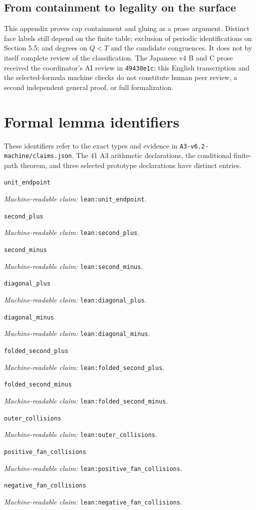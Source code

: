 \documentclass[11pt]{amsart}
\newcommand{\record}[1]{\nolinkurl{#1}}
\newcommand{\claimid}[1]{\par\nopagebreak\noindent\textit{Machine-readable claim:} \record{#1}.\par}
\begin{document}
\subsection{From containment to legality on the surface}
This appendix proves cap containment and gluing as a prose argument.
Distinct face labels still depend on the finite table; exclusion of
periodic identifications on Section 5.5; and degrees on $Q<T$ and the
candidate congruences. It does not by itself complete review of the
classification. The Japanese v4 B and C prose received the coordinator's
AI review in \record{49430e1c}; this English transcription and the
selected-formula machine checks do not constitute human peer review,
a second independent general proof, or full formalization.

\section*{Formal lemma identifiers}
These identifiers refer to the exact types and evidence in \record{A3-v6.2-machine/claims.json}.
The 41 A3 arithmetic declarations, the conditional finite-path theorem,
and three selected prototype declarations have distinct entries.
\par\noindent\label{lean:unit_endpoint}\record{unit_endpoint}
\claimid{lean:unit_endpoint}
\par\noindent\label{lean:second_plus}\record{second_plus}
\claimid{lean:second_plus}
\par\noindent\label{lean:second_minus}\record{second_minus}
\claimid{lean:second_minus}
\par\noindent\label{lean:diagonal_plus}\record{diagonal_plus}
\claimid{lean:diagonal_plus}
\par\noindent\label{lean:diagonal_minus}\record{diagonal_minus}
\claimid{lean:diagonal_minus}
\par\noindent\label{lean:folded_second_plus}\record{folded_second_plus}
\claimid{lean:folded_second_plus}
\par\noindent\label{lean:folded_second_minus}\record{folded_second_minus}
\claimid{lean:folded_second_minus}
\par\noindent\label{lean:outer_collisions}\record{outer_collisions}
\claimid{lean:outer_collisions}
\par\noindent\label{lean:positive_fan_collisions}\record{positive_fan_collisions}
\claimid{lean:positive_fan_collisions}
\par\noindent\label{lean:negative_fan_collisions}\record{negative_fan_collisions}
\claimid{lean:negative_fan_collisions}
\end{document}
